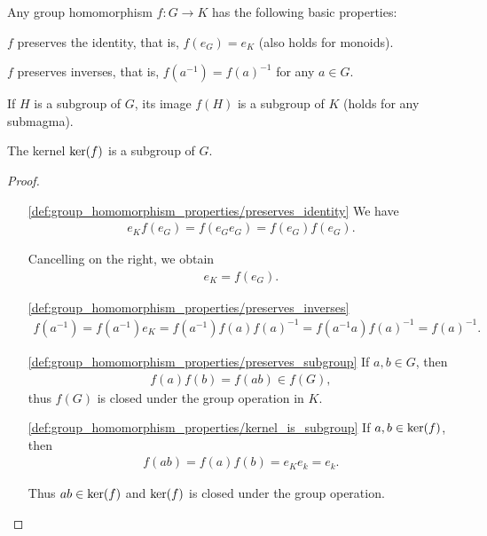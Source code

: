\begin{proposition}\label{thm:group_homomorphism_properties}
  Any group homomorphism $f: G \to K$ has the following basic properties:
  \begin{defenum}
    \item\label{def:group_homomorphism_properties/preserves_identity} $f$ preserves the identity, that is, $f(e_G) = e_K$ (also holds for monoids).
    \item\label{def:group_homomorphism_properties/preserves_inverses} $f$ preserves inverses, that is, $f(a^{-1}) = f(a)^{-1}$ for any $a \in G$.
    \item\label{def:group_homomorphism_properties/preserves_subgroup} If $H$ is a subgroup of $G$, its image $f(H)$ is a subgroup of $K$ (holds for any submagma).
    \item\label{def:group_homomorphism_properties/kernel_is_subgroup} The kernel $\operatorname{ker}(f)$ is a subgroup of $G$.
  \end{defenum}
\end{proposition}
\begin{proof}\mbox{}
  \begin{itemize}
    \item[\ref{def:group_homomorphism_properties/preserves_identity}] We have
    \begin{align*}
      e_K f(e_G) = f(e_G e_G) = f(e_G) f(e_G).
    \end{align*}

    Cancelling on the right, we obtain
    \begin{align*}
      e_K = f(e_G).
    \end{align*}

    \item[\ref{def:group_homomorphism_properties/preserves_inverses}]
    \begin{align*}
      f(a^{-1})
      =
      f(a^{-1}) e_K
      =
      f(a^{-1}) f(a) f(a)^{-1}
      =
      f(a^{-1} a) f(a)^{-1}
      =
      f(a)^{-1}.
    \end{align*}

    \item[\ref{def:group_homomorphism_properties/preserves_subgroup}] If $a, b \in G$, then
    \begin{align*}
      f(a) f(b) = f(ab) \in f(G),
    \end{align*}
    thus $f(G)$ is closed under the group operation in $K$.

    \item[\ref{def:group_homomorphism_properties/kernel_is_subgroup}] If $a, b \in \operatorname{ker}(f)$, then
    \begin{align*}
      f(ab) = f(a) f(b) = e_K e_k = e_k.
    \end{align*}

    Thus $ab \in \operatorname{ker}(f)$ and $\operatorname{ker}(f)$ is closed under the group operation.
  \end{itemize}
\end{proof}

